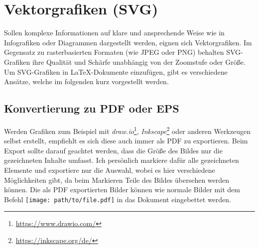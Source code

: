\section{Vektorgrafiken (SVG)}
Sollen komplexe Informationen auf klare und ansprechende Weise wie in Infografiken oder Diagrammen dargestellt werden, eignen sich Vektorgrafiken. Im Gegensatz zu rasterbasierten Formaten (wie JPEG oder PNG) behalten SVG-Grafiken ihre Qualität und Schärfe unabhängig von der Zoomstufe oder Größe. Um SVG-Grafiken in \LaTeX-Dokumente einzufügen, gibt es verschiedene Ansätze, welche im folgenden kurz vorgestellt werden.

\subsection{Konvertierung zu PDF oder EPS}
Werden Grafiken zum Beispiel mit \textit{draw.io}\footnote{\url{https://www.drawio.com/}}, \textit{Inkscape}\footnote{\url{https://inkscape.org/de/}} oder anderen Werkzeugen selbst erstellt, empfiehlt es sich diese auch immer als PDF zu exportieren. Beim Export sollte darauf geachtet werden, dass die Größe des Bildes nur die gezeichneten Inhalte umfasst. Ich persönlich markiere dafür alle gezeichneten Elemente und exportiere nur die Auswahl, wobei es hier verschiedene Möglichkeiten gibt, da beim Markieren Teile des Bildes übersehen werden können. Die als PDF exportierten Bilder können wie normale Bilder mit dem Befehl \texttt{\texttt{[image: path/to/file.pdf]}} in das Dokument eingebettet werden.

